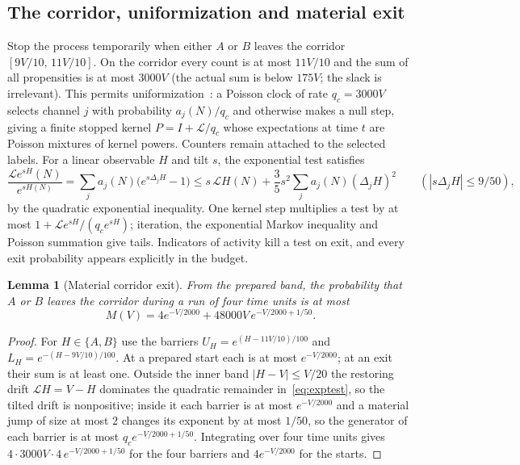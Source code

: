 \documentclass[11pt,a4paper]{article}
\theoremstyle{plain}
\newtheorem{lemma}[theorem]{Lemma}
\theoremstyle{definition}
\theoremstyle{remark}
\newcommand{\Lgen}{\mathcal L}
\begin{document}
\subsection{The corridor, uniformization and material exit}\label{sec:corridor}
Stop the process temporarily when either $A$ or $B$ leaves the corridor $[9V/10,\,11V/10]$. On the corridor every count is at most $11V/10$ and the sum of all propensities is at most $3000V$ (the actual sum is below $175V$; the slack is irrelevant). This permits uniformization~\citep{jensen1953,grassmann1977}: a Poisson clock of rate $q_c=3000V$ selects channel $j$ with probability $a_j(N)/q_c$ and otherwise makes a null step, giving a finite stopped kernel $P=I+\Lgen/q_c$ whose expectations at time $t$ are Poisson mixtures of kernel powers. Counters remain attached to the selected labels. For a linear observable $H$ and tilt $s$, the exponential test satisfies
\begin{equation}\label{eq:exptest}
\frac{\Lgen e^{sH}(N)}{e^{sH(N)}}=\sum_ja_j(N)\bigl(e^{s\Delta_jH}-1\bigr)
\le s\,\Lgen H(N)+\frac35s^2\sum_ja_j(N)(\Delta_jH)^2\qquad(|s\Delta_jH|\le9/50),
\end{equation}
by the quadratic exponential inequality. One kernel step multiplies a test by at most $1+\Lgen e^{sH}/(q_ce^{sH})$; iteration, the exponential Markov inequality and Poisson summation give tails. Indicators of activity kill a test on exit, and every exit probability appears explicitly in the budget.

\begin{lemma}[Material corridor exit]\label{lem:corridor}
From the prepared band, the probability that $A$ or $B$ leaves the corridor during a run of four time units is at most
\begin{equation}\label{eq:M}
M(V)=4e^{-V/2000}+48000V\,e^{-V/2000+1/50}.
\end{equation}
\end{lemma}
\begin{proof}
For $H\in\{A,B\}$ use the barriers $U_H=e^{(H-11V/10)/100}$ and $L_H=e^{-(H-9V/10)/100}$. At a prepared start each is at most $e^{-V/2000}$; at an exit their sum is at least one. Outside the inner band $|H-V|\le V/20$ the restoring drift $\Lgen H=V-H$ dominates the quadratic remainder in~\eqref{eq:exptest}, so the tilted drift is nonpositive; inside it each barrier is at most $e^{-V/2000}$ and a material jump of size at most $2$ changes its exponent by at most $1/50$, so the generator of each barrier is at most $q_ce^{-V/2000+1/50}$. Integrating over four time units gives $4\cdot3000V\cdot4\,e^{-V/2000+1/50}$ for the four barriers and $4e^{-V/2000}$ for the starts.
\end{proof}
\end{document}
